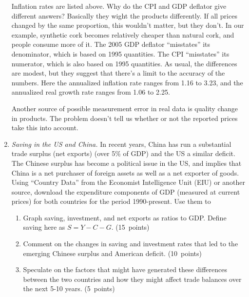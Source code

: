 \documentclass[letterpaper,12pt]{article}
\begin{document}
\begin{enumerate}
Inflation rates are listed above.
Why do the CPI and GDP deflator give different answers?  
Basically they wight the products differently.  
If all prices changed by the same proportion, this wouldn't matter,
but they don't.  In our example, synthetic cork becomes relatively
cheaper than natural cork, and people consume more of it.  The
2005 GDP deflator ``misstates'' its denominator, which is based on
1995 quantities.  The CPI ``misstates'' its numerator, which is
also based on 1995 quantities. As usual, the differences are
modest, but they suggest that there's a limit to the accuracy of
the numbers.  Here the annualized inflation rate ranges from 1.16
to 3.23, and the annualized real growth rate ranges from 1.06 to
2.25.

Another source of possible measurement error in real data 
is quality change in
 products.  The problem doesn't tell us whether or not the
reported prices  take this into account.



\item {\it Saving in the US and China.}  
In recent years, China has run a substantial trade surplus (net exports) 
(over 5\% of GDP) and the US a similar deficit.  
The Chinese surplus has become a political issue in the US, 
and implies that China is a net purchaser of foreign assets
as well as a net exporter of goods.    
Using ``Country Data'' from the Economist Intelligence Unit (EIU)
or another source, 
download the expenditure components of GDP (measured at current prices) 
for both countries for the period 1990-present.  Use them to
%
\begin{enumerate}
\item Graph saving, investment, and net exports as ratios to GDP.  
Define saving here as $S = Y - C - G $. 
(15~points) 

\item Comment on the changes in saving and investment rates 
that led to the emerging Chinese surplus and American deficit.  
(10~points) 

\item Speculate on the factors that might have generated these differences 
between the two countries and how they might affect 
trade balances over the next 5-10 years.    
(5~points) 
\end{enumerate}




\end{enumerate}
\end{document}
